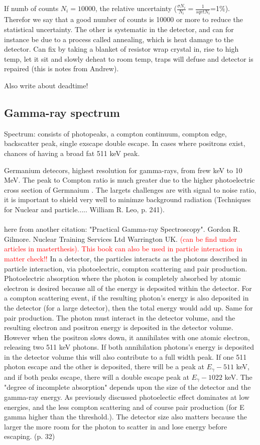 If numb of counts $N_i =10000$, the relative uncertainty ($\frac{\sigma N_i }{N_i}= \frac{1}{{sqrt{N_i}}}$=1\%). Therefor we say that a good number of counts is 10000 or more to reduce the statistical uncertainty. The other is systematic in the detector, and can for instance be due to a process called annealing, which is heat damage to the detector. Can fix by taking a blanket of resistor wrap crystal in, rise to high temp, let it sit and slowly deheat to room temp, traps will defuse and detector is repaired (this is notes from Andrew).

Also write about deadtime! 
\subsection{Gamma-ray spectrum}

Spectrum: consists of photopeaks, a compton continuum, compton edge, backscatter peak, single exscape double escape. In cases where positrons exist, chances of having a broad fat 511 keV peak. 

Germanium detecors, highest resolution for gamma-rays, from frew keV to 10 MeV. The peak to Compton ratio is much greater due to the higher photoelectric cross section of Germnaium . The largets challenges are with signal to noise ratio, it is important to shield very well to minimze background radiation (Techniques for Nuclear and particle..... William R. Leo, p. 241). \\ \\

\noindent 
here from another citation: "Practical Gamma-ray Spectroscopy". Gordon R. Gilmore. Nuclear Training Services Ltd Warrington UK. \textcolor{red}{(can be find under articles in masterthesis). This book can also be used in particle interaction in matter check!!}
In a detector, the particles interacts as the photons described in particle interaction, via photoelectric, compton scattering and pair production. Photoelectric absorption where the photon is completely absorbed by atomic electron is desired because all of the energy is deposited within the detector. For a compton scattering event, if the resulting photon's energy is also deposited in the detector (for a large detector), then the total energy would add up. Same for pair production. The photon must interact in the detector volume, and the resulting electron and positron energy is deposited in the detector volume. However when the positron slows down, it annihilates with one atomic electron, releasing two 511 keV photons. If both annihilation photons's energy is deposited in the detector volume this will also contribute to a full width peak. If one 511 photon escape and the other is deposited, there will be a peak at $E_\gamma-511$ keV, and if both peaks escape, there will a double escape peak at $E_\gamma-1022$ keV. The "degree of incomplete absorption" depends upon the size of the detector and the gamma-ray energy. As previously discussed photoelectic effect dominates at low energies, and the less compton scattering and of course pair production (for E gamma higher than the threshold.). The detector size also matters because the larger the more room for the photon to scatter in and lose energy before escaping. (p. 32) \\

